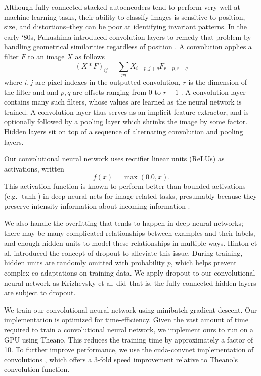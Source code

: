 \documentclass{acm_proc_article-sp}
\begin{document}
Although fully-connected stacked autoencoders tend to perform very well at machine learning tasks, their ability to classify images is sensitive to position, size, and distortions--they can be poor at identifying invariant patterns. In the early `80s, Fukushima introduced convolution layers to remedy that problem by handling geometrical similarities regardless of position \cite{Fukushima}. A convolution applies a filter $F$ to an image $X$ as follows 
$$ (X * F)_{ij} = \sum_{pq}{X_{i+p,j+q}F_{r-p,r-q}} $$
where $i,j$ are pixel indexes in the outputted convolution, $r$ is the dimension of the filter and and $p,q$ are offsets ranging from $0$ to $r-1$ \cite{larochelle_convnet}. A convolution layer contains many such filters, whose values are learned as the neural network is trained. A convolution layer thus serves as an implicit feature extractor, and is optionally followed by a pooling layer which shrinks the image by some factor. Hidden layers sit on top of a sequence of alternating convolution and pooling layers.

Our convolutional neural network uses rectifier linear units (ReLUs) as activations, written  $$f(x) = \max(0.0, x).$$ This activation function is known to perform better than bounded activations (e.g. $\tanh$) in deep neural nets for image-related tasks, presumably because they preserve intensity information about incoming information \cite{Nair}.

We also handle the overfitting that tends to happen in deep neural networks; there may be many complicated relationships between examples and their labels, and enough hidden units to model these relationships in multiple ways. Hinton et al. \cite{Hinton} introduced the concept of dropout to alleviate this issue. During training, hidden units are randomly omitted with probability $p$, which helps prevent complex co-adaptations on training data. We apply dropout to our convolutional neural network as Krizhevsky et al. \cite{Krizhevsky} did--that is, the fully-connected hidden layers are subject to dropout.

We train our convolutional neural network using minibatch gradient descent. Our implementation is optimized for time-efficiency. Given the vast amount of time required to train a convolutional neural network, we implement ours to run on a GPU using Theano. This reduces the training time by approximately a factor of 10. To further improve performance, we use the cuda-convnet implementation of convolutions \cite{Krizhevsky}, which offers a 3-fold speed improvement relative to Theano's convolution function.
\end{document}
